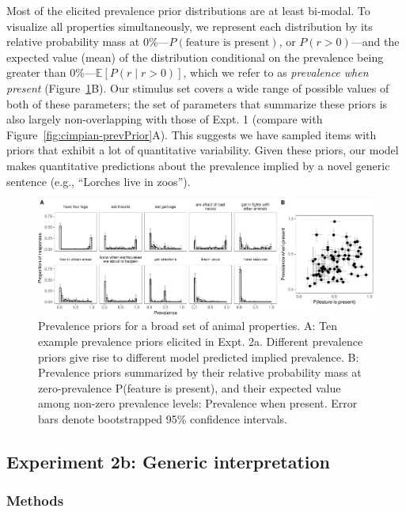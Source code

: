 \documentclass[floatsintext,man]{apa6}
\theoremstyle{definition}
\theoremstyle{definition}
\theoremstyle{definition}
\theoremstyle{remark}
\begin{document}
Most of the elicited prevalence prior distributions are at least
bi-modal. To visualize all properties simultaneously, we represent each
distribution by its relative probability mass at
0\%---\(P(\text{feature is present})\), or \(P(r > 0)\)---and the
expected value (mean) of the distribution conditional on the prevalence
being greater than 0\%---\(\mathbb{E}[P(r \mid r>0)]\), which we refer
to as \emph{prevalence when present}
(Figure~\ref{fig:genInt-prevPrior}B). Our stimulus set covers a wide
range of possible values of both of these parameters; the set of
parameters that summarize these priors is also largely non-overlapping
with those of Expt. 1 (compare with
Figure~\ref{fig:cimpian-prevPrior}A). This suggests we have sampled
items with priors that exhibit a lot of quantitative variability. Given
these priors, our model makes quantitative predictions about the
prevalence implied by a novel generic sentence (e.g., \enquote{Lorches
live in zoos}).

\begin{figure}
\centering
\includegraphics{genint_files/figure-latex/genInt-prevPrior-1.pdf}
\caption{\label{fig:genInt-prevPrior}Prevalence priors for a broad set of
animal properties. A: Ten example prevalence priors elicited in Expt.
2a. Different prevalence priors give rise to different model predicted
implied prevalence. B: Prevalence priors summarized by their relative
probability mass at zero-prevalence P(feature is present), and their
expected value among non-zero prevalence levels: Prevalence when
present. Error bars denote bootstrapped 95\% confidence intervals.}
\end{figure}

\subsection{Experiment 2b: Generic
interpretation}\label{experiment-2b-generic-interpretation}

\subsubsection{Methods}\label{methods-1}
\end{document}
